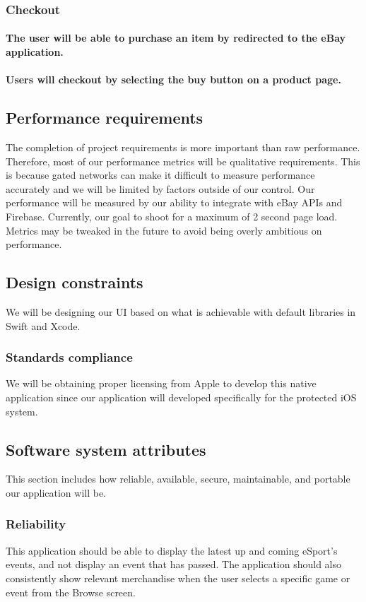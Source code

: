 \documentclass[onecolumn, draftclsnofoot,10pt, compsoc]{IEEEtran}
\begin{document}
\subsubsection{Checkout}
\paragraph{The user will be able to purchase an item by redirected to the eBay application.}
\paragraph{Users will checkout by selecting the buy button on a product page.}

\subsection{Performance requirements}
The completion of project requirements is more important than raw performance. Therefore, most of our performance metrics will be qualitative requirements. This is because gated networks can make it difficult to measure performance accurately and we will be limited by factors outside of our control. Our performance will be measured by our ability to integrate with eBay APIs and Firebase. Currently, our goal to shoot for a maximum of 2 second page load. Metrics may be tweaked in the future to avoid being overly ambitious on performance.

\subsection{Design constraints}
We will be designing our UI based on what is achievable with default libraries in Swift and Xcode. 
 
\subsubsection{Standards compliance}
We will be obtaining proper licensing from Apple to develop this native application since our application will developed specifically for the protected iOS system.

\subsection{Software system attributes}
This section includes how reliable, available, secure, maintainable, and portable our application will be.

\subsubsection{Reliability}
This application should be able to display the latest up and coming eSport's events, and not display an event that has passed. The application should also consistently show relevant merchandise when the user selects a specific game or event from the Browse screen.
\end{document}
